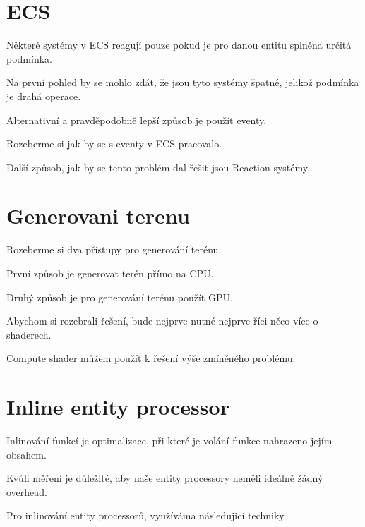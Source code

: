 \section{ECS}

Některé systémy v ECS reagují pouze pokud je pro danou entitu splněna určitá podmínka.

Na první pohled by se mohlo zdát, že jsou tyto systémy špatné, jelikož podmínka je drahá operace.

Alternativní a pravděpodobně lepší způsob je použít eventy.

Rozeberme si jak by se s eventy v ECS pracovalo.

Další způsob, jak by se tento problém dal řešit jsou Reaction systémy.


\section{Generovani terenu}

Rozeberme si dva přístupy pro generování terénu.

První způsob je generovat terén přímo na CPU.

Druhý způsob je pro generování terénu použít GPU.


Abychom si rozebrali řešení, bude nejprve nutné nejprve říci něco více o shaderech.

Compute shader můžem použít k řešení výše zmíněného problému.


\section{Inline entity processor}

Inlinování funkcí je optimalizace, při které je volání funkce nahrazeno jejím obsahem.


Kvůli měření je důležité, aby naše entity processory neměli ideálně žádný overhead.

Pro inlinování entity processorů, využíváma následujicí techniky.


